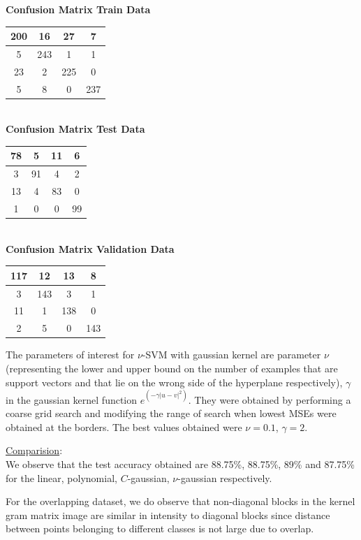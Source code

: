 \documentclass{article}
\begin{document}
\begin{flushleft}
\textbf{Confusion Matrix Train Data\\[5pt]}
\begin{tabular}{|c|c|c|c|}
\hline
200 & 16 & 27 & 7 \\
\hline
5 & 243 & 1 & 1 \\
\hline
23 & 2 & 225 & 0 \\
\hline
5 & 8 & 0 & 237 \\
\hline
\end{tabular}
\textbf{\\[10pt] Confusion Matrix Test Data \\[5pt]}
\begin{tabular}{|c|c|c|c|}
\hline
78 & 5 & 11 & 6 \\
\hline
3 & 91 & 4 & 2 \\
\hline
13 & 4 & 83 & 0 \\
\hline
1 & 0 & 0 & 99 \\
\hline
\end{tabular}
\textbf{\\[10pt] Confusion Matrix Validation Data \\[5pt]}
\begin{tabular}{|c|c|c|c|}
\hline
117 & 12 & 13 & 8 \\
\hline
3 & 143 & 3 & 1 \\
\hline
11 & 1 & 138 & 0 \\
\hline
2 & 5 & 0 & 143 \\
\hline
\end{tabular}
\end{flushleft}


The parameters of interest for $\nu$-SVM with gaussian kernel are parameter $\nu$(representing the lower and upper bound on the number of examples that are support vectors and that lie on the wrong side of the hyperplane respectively), $\gamma$ in the gaussian kernel function $e^{(-\gamma|u-v|^{2})}$. They were obtained by performing a coarse grid search and modifying the range of search when lowest MSEs were obtained at the borders.
The best values obtained were $\nu=0.1$, $\gamma=2$.

\underline{Comparision}:\\
We observe that the test accuracy obtained are 88.75\%, 88.75\%, 89\% and 87.75\% for the linear, polynomial, $C$-gaussian, $\nu$-gaussian respectively. 

For the overlapping dataset, we do observe that non-diagonal blocks in the kernel gram matrix image are similar in intensity to diagonal blocks since distance between points belonging to different classes is not large due to overlap.
\end{document}
